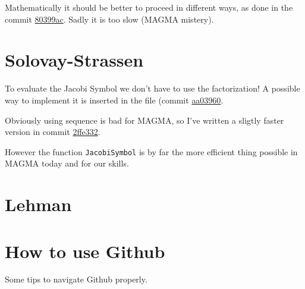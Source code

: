 \documentclass{article}
\theoremstyle{plain}
\theoremstyle{remark}
\theoremstyle{definition}
\begin{document}
Mathematically it should be better to proceed in different ways, as done in the commit \href{https://github.com/giacomoborin/project2_MAGMA/commit/80399ac928cf19e009451f174adc4138283580f2}{80399ac}. Sadly it is too slow (MAGMA mistery).



\section{Solovay-Strassen}


To evaluate the Jacobi Symbol we don't have to use the factorization! A possible way to implement it is inserted in the file (commit \href{https://github.com/giacomoborin/project2_MAGMA/commit/aa03960b86ec942f5f35c55e297850a3e2b2beba}{aa03960}.

Obviously using sequence is bad for MAGMA, so I've written a sligtly faster version in commit \href{https://github.com/giacomoborin/project2_MAGMA/commit/2ffe332f8ee782b20a079694f1c1cf9363aae3d0}{2ffe332}.


However the function \verb|JacobiSymbol| is by far the more efficient thing possible in MAGMA today and for our skills. 


\section{Lehman}

\appendix

\section{How to use Github}

Some tips to navigate Github properly. 

\newpage
\printbibliography
\end{document}
